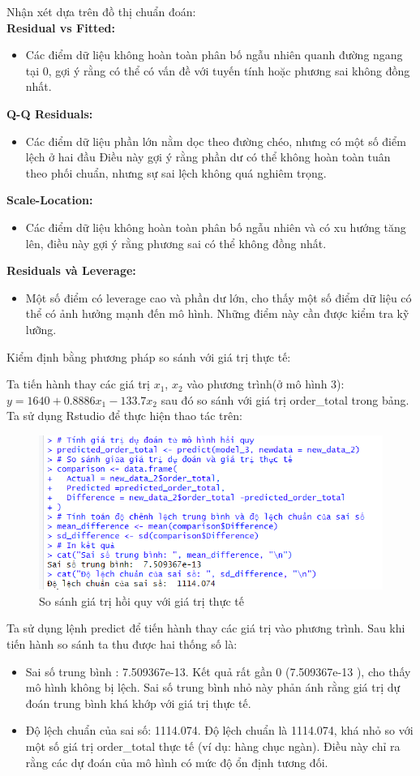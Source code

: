 Nhận xét dựa trên đồ thị chuẩn đoán:\\
\textbf{Residual vs Fitted:}
\begin{itemize}
 \item Các điểm dữ liệu không hoàn toàn phân bố ngẫu nhiên quanh đường ngang tại 0, gợi ý rằng có thể có vấn đề với tuyến tính hoặc phương sai không đồng nhất. 
\end{itemize}
 \textbf{Q-Q Residuals:}
 \begin{itemize}
\item Các điểm dữ liệu phần lớn nằm dọc theo đường chéo, nhưng có một số điểm lệch ở hai đầu Điều này gợi ý rằng phần dư có thể không hoàn toàn tuân theo phối chuẩn, nhưng sự sai lệch không quá nghiêm trọng.
 \end{itemize}
\textbf{Scale-Location:}
\begin{itemize}
\item Các điểm dữ liệu không hoàn toàn phân bố ngẫu nhiên và có xu hướng tăng lên, điều này gợi ý rằng phương sai có thể không đồng nhất.
\end{itemize}
\textbf{Residuals và Leverage:}
\begin{itemize}
\item Một số điểm có leverage cao và phần dư lớn, cho thấy một số điểm dữ liệu  có thể có ảnh hưởng mạnh đến mô hình. Những điểm này cần được kiểm tra kỹ lưỡng.
\end{itemize}

Kiểm định bằng phương pháp so sánh với giá trị thực tế:

Ta tiến hành thay các giá trị $x_1$, $x_2$ vào phương trình(ở mô hình 3): $y= 1640 + 0.8886x_1 - 133.7 x_2$ sau đó so sánh với giá trị order\_total trong bảng. Ta sử dụng Rstudio để thực hiện thao tác trên:

\begin{figure}[h]
  \centering
  \includegraphics[width=0.5\linewidth]{graphics/5.5.7.png}
  \caption{So sánh giá trị hồi quy với giá trị thực tế }
\end{figure}

Ta sử dụng lệnh predict để tiến hành thay các giá trị vào phương trình. Sau khi tiến hành so sánh ta thu được hai thống số là:
\begin{itemize}
  \item Sai số trung bình : 7.509367e-13. Kết quả rất gần 0 (7.509367e-13 ), cho thấy mô hình không bị lệch. Sai số trung bình nhỏ này phản ánh rằng giá trị dự đoán trung bình khá khớp với giá trị thực tế.
  \item Độ lệch chuẩn của sai số: 1114.074. Độ lệch chuẩn là 1114.074, khá nhỏ so với một số giá trị order\_total thực tế (ví dụ: hàng chục ngàn). Điều này chỉ ra rằng các dự đoán của mô hình có mức độ ổn định tương đối.
\end{itemize}

